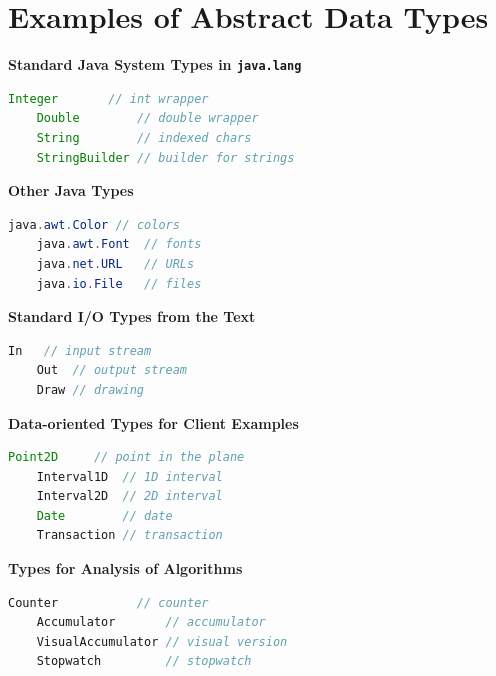 \documentclass[8pt,a4paper,compress]{beamer}
\begin{document}
\section{Examples of Abstract Data Types}
\begin{frame}[fragile]
\pause

\textbf{Standard Java System Types in \lstinline$java.lang$}
\begin{lstlisting}[language=Java]
    Integer       // int wrapper
    Double        // double wrapper
    String        // indexed chars
    StringBuilder // builder for strings
\end{lstlisting}

\pause
\smallskip

\textbf{Other Java Types}
\begin{lstlisting}[language=Java]
    java.awt.Color // colors
    java.awt.Font  // fonts
    java.net.URL   // URLs
    java.io.File   // files
\end{lstlisting}

\pause
\smallskip

\textbf{Standard I/O Types from the Text}
\begin{lstlisting}[language=Java]
    In   // input stream
    Out  // output stream
    Draw // drawing
\end{lstlisting}

\pause
\smallskip

\textbf{Data-oriented Types for Client Examples}
\begin{lstlisting}[language=Java]
    Point2D     // point in the plane
    Interval1D  // 1D interval
    Interval2D  // 2D interval
    Date        // date
    Transaction // transaction
\end{lstlisting}

\pause
\smallskip

\textbf{Types for Analysis of Algorithms}
\begin{lstlisting}[language=Java]
    Counter           // counter
    Accumulator       // accumulator
    VisualAccumulator // visual version
    Stopwatch         // stopwatch
\end{lstlisting}
\end{frame}
\end{document}
